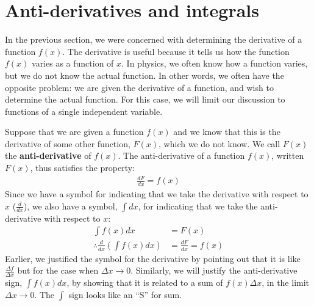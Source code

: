 \section{Anti-derivatives and integrals}
In the previous section, we were concerned with determining the derivative of a function $f(x)$. The derivative is useful because it tells us how the function $f(x)$ varies as a function of $x$. In physics, we often know how a function varies, but we do not know the actual function. In other words, we often have the opposite problem: we are given the derivative of a function, and wish to determine the actual function. For this case, we will limit our discussion to functions of a single independent variable.

Suppose that we are given a function $f(x)$ and we know that this is the derivative of some other function, $F(x)$, which we do not know. We call $F(x)$ the \textbf{anti-derivative} of $f(x)$. The anti-derivative of a function $f(x)$, written $F(x)$, thus satisfies the property:
\begin{align*}
\frac{dF}{dx}=f(x)
\end{align*}
Since we have a symbol for indicating that we take the derivative with respect to $x$ ($\frac{d}{dx}$), we also have a symbol, $\int dx$, for indicating that we take the anti-derivative with respect to $x$:
\begin{align*}
\int f(x) dx &= F(x) \\
\therefore \frac{d}{dx}\left(\int f(x) dx\right) &= \frac{dF}{dx}=f(x)
\end{align*}
Earlier, we justified the symbol for the derivative by pointing out that it is like $\frac{\Delta f}{\Delta x}$ but for the case when $\Delta x\to 0$. Similarly, we will justify the anti-derivative sign, $\int f(x) dx$, by showing that it is related to a sum of $f(x)\Delta x$, in the limit $\Delta x\to 0$. The $\int$ sign looks like an ``S'' for sum.

